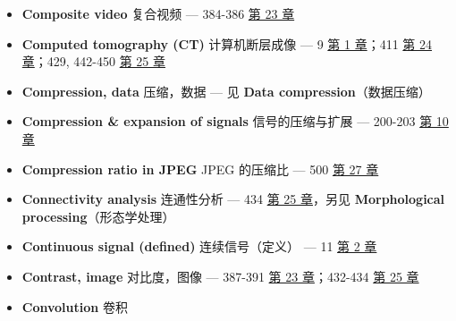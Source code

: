 \begin{itemize}
{  章}；546  \hyperref[ch-29]{第 29 章}
\item
  \textbf{Composite video} 复合视频 --- 384-386 
  \hyperref[ch-23]{第 23 章}
\item
  \textbf{Computed tomography (CT)} 计算机断层成像 --- 9 
  \hyperref[ch-01]{第 1 章}；411  \hyperref[ch-24]{第 24
  章}；429, 442-450  \hyperref[ch-25]{第 25 章}
\item
  \textbf{Compression, data} 压缩，数据 --- 见 \textbf{Data
  compression}（数据压缩）
\item
  \textbf{Compression \& expansion of signals} 信号的压缩与扩展 ---
  200-203  \hyperref[ch-10]{第 10 章}
\item
  \textbf{Compression ratio in JPEG} JPEG 的压缩比 --- 500 
  \hyperref[ch-27]{第 27 章}
\item
  \textbf{Connectivity analysis} 连通性分析 --- 434 
  \hyperref[ch-25]{第 25 章}，另见 \textbf{Morphological
  processing}（形态学处理）
\item
  \textbf{Continuous signal (defined)} 连续信号（定义） --- 11
   \hyperref[ch-02]{第 2 章}
\item
  \textbf{Contrast, image} 对比度，图像 --- 387-391 
  \hyperref[ch-23]{第 23 章}；432-434  \hyperref[ch-25]{第 25
  章}
\item
  \textbf{Convolution} 卷积


\end{itemize}
